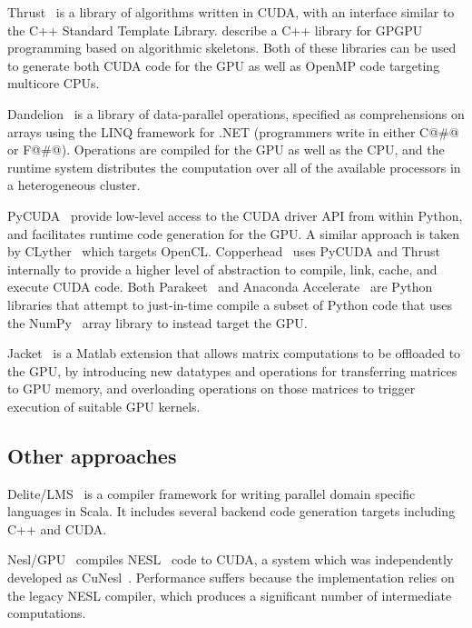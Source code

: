 Thrust~\cite{ThrustAParallelT:ub} is a library of algorithms written in CUDA,
with an interface similar to the C++ Standard Template Library.
\citet{Sato:2009cq} describe a C++ library for GPGPU programming based on
algorithmic skeletons. Both of these libraries can be used to generate both CUDA
code for the GPU as well as OpenMP code targeting multicore CPUs.



Dandelion~\cite{Rossbach:2013bj} is a library of data-parallel operations,
specified as comprehensions on arrays using the LINQ framework for .NET
(programmers write in either C@#@ or F@#@). Operations are compiled for the GPU
as well as the CPU, and the runtime system distributes the computation over all
of the available processors in a heterogeneous cluster.

PyCUDA~\cite{Klockner:2012tj} provide low-level access to the CUDA driver API
from within Python, and facilitates runtime code generation for the GPU\@. A
similar approach is taken by CLyther~\cite{CLyther:EvXSiruK} which targets
OpenCL. Copperhead~\cite{Catanzaro:2011cn} uses PyCUDA and Thrust internally to
provide a higher level of abstraction to compile, link, cache, and execute CUDA
code. Both Parakeet~\cite{Rubinsteyn:2012ve} and Anaconda
Accelerate~\cite{AnacondaAccelerate:2013vn} are Python libraries that attempt to
just-in-time compile a subset of Python code that uses the
NumPy~\cite{NumPy:2006uq} array library to instead target the GPU\@.

Jacket~\cite{AccelerEyes:vq} is a Matlab extension that allows matrix
computations to be offloaded to the GPU, by introducing new datatypes and
operations for transferring matrices to GPU memory, and overloading operations
on those matrices to trigger execution of suitable GPU kernels.


\subsection{Other approaches}

Delite/LMS~\cite{Rompf:2013er} is a compiler framework for writing parallel domain
specific languages in Scala. It includes several backend code generation targets
including C++ and CUDA\@.

Nesl/GPU~\cite{Bergstrom:2012bi} compiles NESL~\cite{Blelloch:1995ut} code to
CUDA, a system which was independently developed as CuNesl~\cite{Zhang:2012jl}.
Performance suffers because the implementation relies on the legacy NESL
compiler, which produces a significant number of intermediate computations.

